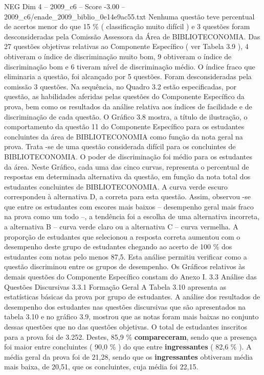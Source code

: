 \begin{textsample}{NEG Dim 4 – 2009\_c6 – Score -3.00 – 2009\_c6/enade\_2009\_biblio\_0e14e9ac55.txt}
Nenhuma questão teve percentual de acertos menor do que 15 \% ( classificação muito difícil ) e 3 questões foram desconsideradas pela Comissão Assessora da Área de BIBLIOTECONOMIA.
Das 27 questões objetivas relativas ao Componente Específico ( ver Tabela 3.9 ), 4 obtiveram o índice de discriminação muito bom, 9 obtiveram o índice de discriminação bom e 6 tiveram nível de discriminação médio.
O índice fraco que eliminaria a questão, foi alcançado por 5 questões.
Foram desconsideradas pela comissão 3 questões.
Na sequência, no Quadro 3.2 estão especificadas, por questão, as habilidades aferidas pelas questões do Componente Específico da prova, bem como os resultados da análise relativa aos índices de facilidade e de discriminação de cada questão.
O Gráfico 3.8 mostra, a título de ilustração, o comportamento da questão 11 do Componente Específico para os estudantes concluintes da área de BIBLIOTECONOMIA como função da nota geral na prova.
Trata -se de uma questão considerada difícil para os concluintes de BIBLIOTECONOMIA.
O poder de discriminação foi médio para os estudantes da área.
Neste Gráfico, cada uma das cinco curvas, representa o percentual de respostas em determinada alternativa da questão, em função da nota total dos estudantes concluintes de BIBLIOTECONOMIA.
A curva verde escuro correspondeu à alternativa D, a correta para esta questão.
Assim, observou -se que entre os estudantes com escores mais baixos – desempenho geral mais fraco na prova como um todo –, a tendência foi a escolha de uma alternativa incorreta, a alternativa B – curva verde claro ou a alternativa C – curva vermelha.
A proporção de estudantes que selecionou a resposta correta aumentou com o desempenho deste grupo de estudantes chegando ao acerto de 100 \% dos estudantes com notas pelo menos 87,5.
Esta análise permitiu verificar como a questão discriminou entre os grupos de desempenho.
Os Gráficos relativos às demais questões do Componente Específico constam do Anexo I. 3.3 Análise das Questões Discursivas 3.3.1 Formação Geral A Tabela 3.10 apresenta as estatísticas básicas da prova por grupo de estudantes.
A análise dos resultados de desempenho dos estudantes nas questões discursivas que são apresentados na tabela 3.10 e no gráfico 3.9, mostrou que as notas foram mais baixas no conjunto dessas questões que no das questões objetivas.
O total de estudantes inscritos para a prova foi de 3.252.
Destes, 85,9 \% \textbf{compareceram}, sendo que a presença foi maior entre concluintes ( 90,0 \% ) do que entre \textbf{ingressantes} ( 82,6 \% ).
A média geral da prova foi de 21,28, sendo que os \textbf{ingressantes} obtiveram média mais baixa, de 20,51, que os concluintes, cuja média foi 22,15.

\end{textsample}
